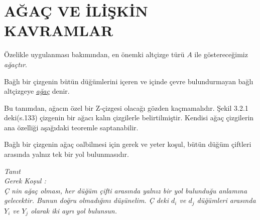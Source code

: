 \documentclass[11pt]{amsbook}
\begin{document}

\section{AĞAÇ VE İLİŞKİN KAVRAMLAR}
Özelikle uygulanması bakımından, en önemki altçizge türü $A$ ile göstereceğimiz {\itshape ağaçtır}.

\begin{definition}
Bağlı bir çizgenin bütün düğümlerini içeren ve içinde çevre bulundurmayan bağlı altçizgeye \underline{{\itshape ağaç}} denir.
\end{definition}

Bu tanımdan, ağacın özel bir Z-çizgesi olacağı gözden kaçmamalıdır. Şekil 3.2.1 deki(s.133) çizgenin bir ağacı kalın çizgilerle belirtilmiştir. Kendisi ağaç çizgilerin ana özelliği aşağıdaki teoremle saptanabilir.

\begin{theorem}
Bağlı bir çizgenin ağaç oalbilmesi için gerek ve yeter koşul, bütün düğüm çiftleri arasında yalnız tek bir yol bulunmasıdır.
\end{theorem}

\itshape{Tanıt} \\
\itshape{Gerek Koşul :} \\
Ç nin ağaç olması, her düğüm çifti arasında yalnız bir yol bulunduğu anlamına gelecektir. Bunun doğru olmadığını düşünelim. Ç deki $d_i$ ve $d_j$ düğümleri arasında $Y_i$ ve $Y_j$ olarak iki ayrı yol bulunsun.
\end{document}
